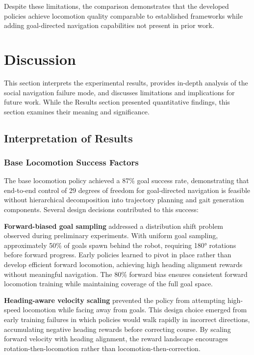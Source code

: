 \documentclass[12pt,a4paper]{article}
\begin{document}
Despite these limitations, the comparison demonstrates that the developed policies achieve locomotion quality comparable to established frameworks while adding goal-directed navigation capabilities not present in prior work.

\newpage
\section{Discussion}

This section interprets the experimental results, provides in-depth analysis of the social navigation failure mode, and discusses limitations and implications for future work. While the Results section presented quantitative findings, this section examines their meaning and significance.

\subsection{Interpretation of Results}

\subsubsection{Base Locomotion Success Factors}

The base locomotion policy achieved a 87\% goal success rate, demonstrating that end-to-end control of 29 degrees of freedom for goal-directed navigation is feasible without hierarchical decomposition into trajectory planning and gait generation components. Several design decisions contributed to this success:

\textbf{Forward-biased goal sampling} addressed a distribution shift problem observed during preliminary experiments. With uniform goal sampling, approximately 50\% of goals spawn behind the robot, requiring 180° rotations before forward progress. Early policies learned to pivot in place rather than develop efficient forward locomotion, achieving high heading alignment rewards without meaningful navigation. The 80\% forward bias ensures consistent forward locomotion training while maintaining coverage of the full goal space.

\textbf{Heading-aware velocity scaling} prevented the policy from attempting high-speed locomotion while facing away from goals. This design choice emerged from early training failures in which policies would walk rapidly in incorrect directions, accumulating negative heading rewards before correcting course. By scaling forward velocity with heading alignment, the reward landscape encourages rotation-then-locomotion rather than locomotion-then-correction.
\end{document}
